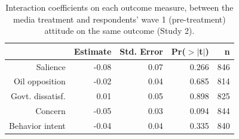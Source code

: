 \begin{table}[ht]
\centering
\caption{Interaction coefficients on each outcome measure, between the media
             treatment and respondents' wave 1 (pre-treatment) attitude on the same outcome (Study 2).} 
\label{tab:disruption_bywave1_2}
\begin{tabular}{rrrrr}
  \hline
 & Estimate & Std. Error & Pr($>$$|$t$|$) & n \\ 
  \hline
Salience & -0.08 & 0.07 & 0.266 & 846 \\ 
  Oil opposition & -0.02 & 0.04 & 0.685 & 814 \\ 
  Govt. dissatisf. & 0.01 & 0.05 & 0.898 & 825 \\ 
  Concern & -0.05 & 0.03 & 0.094 & 844 \\ 
  Behavior intent & -0.04 & 0.04 & 0.335 & 840 \\ 
   \hline
\end{tabular}
\end{table}
